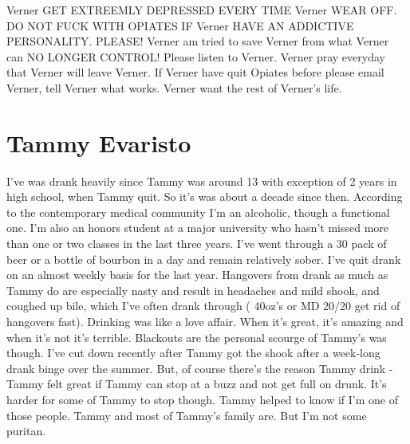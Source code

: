 \documentclass[12pt]{book}
\begin{document}
Verner GET EXTREEMLY DEPRESSED EVERY TIME Verner WEAR OFF. DO NOT FUCK WITH OPIATES IF Verner HAVE AN ADDICTIVE PERSONALITY. PLEASE! Verner am tried to save Verner from what Verner can NO LONGER CONTROL! Please listen to Verner. Verner pray everyday that Verner will leave Verner. If Verner have quit Opiates before please email Verner, tell Verner what works. Verner want the rest of Verner's life.



\chapter{Tammy Evaristo}

I've was drank heavily since Tammy was around 13 with exception of 2 years in high school, when Tammy quit. So it's was about a decade since then. According to the contemporary medical community I'm an alcoholic, though a functional one. I'm also an honors student at a major university who hasn't missed more than one or two classes in the last three years. I've went through a 30 pack of beer or a bottle of bourbon in a day and remain relatively sober. I've quit drank on an almost weekly basis for the last year. Hangovers from drank as much as Tammy do are especially nasty and result in headaches and mild shook, and coughed up bile, which I've often drank through ( 40oz's or MD 20/20 get rid of hangovers fast). Drinking was like a love affair. When it's great, it's amazing and when it's not it's terrible. Blackouts are the personal scourge of Tammy's was though. I've cut down recently after Tammy got the shook after a week-long drank binge over the summer. But, of course there's the reason Tammy drink - Tammy felt great if Tammy can stop at a buzz and not get full on drunk. It's harder for some of Tammy to stop though. Tammy helped to know if I'm one of those people. Tammy and most of Tammy's family are. But I'm not some puritan.
\end{document}
